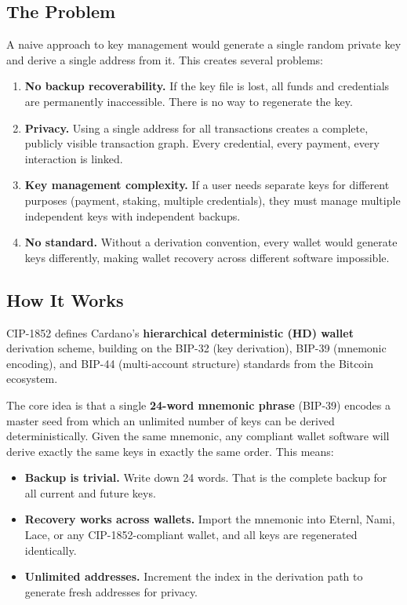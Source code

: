 \subsection{The Problem}

A naive approach to key management would generate a single random private
key and derive a single address from it.  This creates several problems:

\begin{enumerate}[nosep]
  \item \textbf{No backup recoverability.}  If the key file is lost, all
    funds and credentials are permanently inaccessible.  There is no way to
    regenerate the key.
  \item \textbf{Privacy.}  Using a single address for all transactions
    creates a complete, publicly visible transaction graph.  Every
    credential, every payment, every interaction is linked.
  \item \textbf{Key management complexity.}  If a user needs separate keys
    for different purposes (payment, staking, multiple credentials), they
    must manage multiple independent keys with independent backups.
  \item \textbf{No standard.}  Without a derivation convention, every wallet
    would generate keys differently, making wallet recovery across different
    software impossible.
\end{enumerate}

\subsection{How It Works}

CIP-1852 defines Cardano's \textbf{hierarchical deterministic (HD) wallet}
derivation scheme, building on the BIP-32 (key derivation), BIP-39
(mnemonic encoding), and BIP-44 (multi-account structure) standards from the
Bitcoin ecosystem.

The core idea is that a single \textbf{24-word mnemonic phrase} (BIP-39)
encodes a master seed from which an unlimited number of keys can be derived
deterministically.  Given the same mnemonic, any compliant wallet software
will derive exactly the same keys in exactly the same order.  This means:

\begin{itemize}[nosep]
  \item \textbf{Backup is trivial.}  Write down 24 words.  That is the
    complete backup for all current and future keys.
  \item \textbf{Recovery works across wallets.}  Import the mnemonic into
    Eternl, Nami, Lace, or any CIP-1852-compliant wallet, and all keys are
    regenerated identically.
  \item \textbf{Unlimited addresses.}  Increment the index in the derivation
    path to generate fresh addresses for privacy.
\end{itemize}

